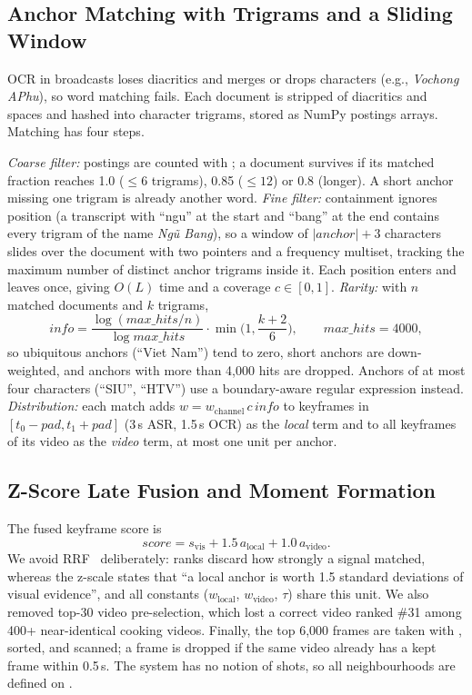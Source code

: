 \documentclass[runningheads]{llncs}
\newcommand{\code}[1]{\texttt{\detokenize{#1}}}
\begin{document}
\subsection{Anchor Matching with Trigrams and a Sliding Window}
\label{sec:anchor}
OCR in broadcasts loses diacritics and merges or drops characters (e.g., \textit{Vochong APhu}), so word matching fails. Each document is stripped of diacritics and spaces and hashed into character trigrams, stored as NumPy postings arrays. Matching has four steps.

\emph{Coarse filter:} postings are counted with \code{np.bincount}; a document survives if its matched fraction reaches 1.0 ($\le6$ trigrams), 0.85 ($\le12$) or 0.8 (longer). A short anchor missing one trigram is already another word. \emph{Fine filter:} containment ignores position (a transcript with ``ngu'' at the start and ``bang'' at the end contains every trigram of the name \textit{Ng\~u Bang}), so a window of $|\mathit{anchor}|+3$ characters slides over the document with two pointers and a frequency multiset, tracking the maximum number of distinct anchor trigrams inside it. Each position enters and leaves once, giving $O(L)$ time and a coverage $c\in[0,1]$. \emph{Rarity:} with $n$ matched documents and $k$ trigrams,
\begin{equation}
\mathit{info}=\frac{\log(\mathit{max\_hits}/n)}{\log\mathit{max\_hits}}\cdot\min\!\Big(1,\frac{k+2}{6}\Big),\qquad \mathit{max\_hits}=4000,
\label{eq:info}
\end{equation}
so ubiquitous anchors (``Viet Nam'') tend to zero, short anchors are down-weighted, and anchors with more than 4,000 hits are dropped. Anchors of at most four characters (``SIU'', ``HTV'') use a boundary-aware regular expression instead. \emph{Distribution:} each match adds $w=w_{\mathrm{channel}}\,c\,\mathit{info}$ to keyframes in $[t_0-\mathit{pad},t_1+\mathit{pad}]$ (3\,s ASR, 1.5\,s OCR) as the \emph{local} term and to all keyframes of its video as the \emph{video} term, at most one unit per anchor.

\subsection{Z-Score Late Fusion and Moment Formation}
\label{sec:fusion}
The fused keyframe score is
\begin{equation}
\mathit{score}=s_{\mathrm{vis}}+1.5\,a_{\mathrm{local}}+1.0\,a_{\mathrm{video}}.
\label{eq:fusion}
\end{equation}
We avoid RRF~\cite{cormack2009rrf} deliberately: ranks discard how strongly a signal matched, whereas the z-scale states that ``a local anchor is worth 1.5 standard deviations of visual evidence'', and all constants ($w_{\mathrm{local}}$, $w_{\mathrm{video}}$, $\tau$) share this unit. We also removed top-30 video pre-selection, which lost a correct video ranked \#31 among 400+ near-identical cooking videos. Finally, the top 6,000 frames are taken with \code{np.argpartition}, sorted, and scanned; a frame is dropped if the same video already has a kept frame within 0.5\,s. The system has no notion of shots, so all neighbourhoods are defined on \code{pts_time}.
\end{document}
